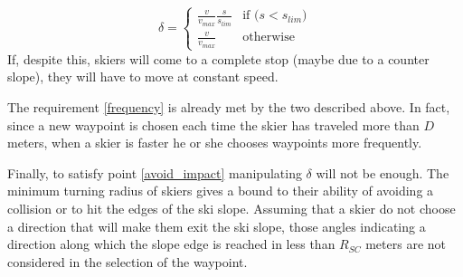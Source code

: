 \documentclass[12pt,a4paper,twoside]{book}
\begin{document}
\begin{equation}
\delta=\begin{cases}
   \frac{v}{v_{max}}\frac{s}{s_{lim}} & \text{if ($s < s_{lim}$)} \\
   \frac{v}{v_{max}} & \text{otherwise}
\end{cases}
\end{equation}
If, despite this, skiers will come to a complete stop (maybe due to a counter slope), they will have to move at constant speed.

The requirement \ref{frequency} is already met by the two  described above. In fact, since a new waypoint is chosen each time the skier has traveled more than $D$ meters, when a skier is faster he or she chooses waypoints more frequently.

Finally, to satisfy point \ref{avoid_impact} manipulating $\delta$ will  not be  enough. The minimum turning radius of skiers gives a bound to their ability of avoiding a collision or to hit the edges of the ski slope. Assuming that a skier do not choose a direction that will make them exit the ski slope, those angles indicating a direction along which the slope edge is reached in less than $R_{SC}$ meters are not considered in the selection of the waypoint.


\end{document}
